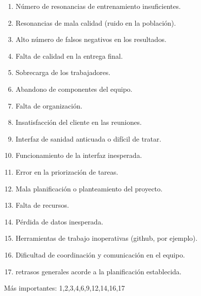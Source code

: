 \begin{enumerate}
	\item Número de resonancias de entrenamiento insuficientes.
	\item Resonancias de mala calidad (ruido en la población).
	\item Alto número de falsos negativos en los resultados.
	\item Falta de calidad en la entrega final.
	\item Sobrecarga de los trabajadores.
	\item Abandono de componentes del equipo.
	\item Falta de organización.
	\item Insatisfacción del cliente en las reuniones.
	\item Interfaz de sanidad anticuada o difícil de tratar.
	\item Funcionamiento de la interfaz inesperada.
	\item Error en la priorización de tareas.
	\item Mala planificación o planteamiento del proyecto.
	\item Falta de recursos.
	\item Pérdida de datos inesperada.
	\item Herramientas de trabajo inoperativas (github, por ejemplo).
	\item Dificultad de coordinación y comunicación en el equipo.
	\item retrasos generales acorde a la planificación establecida.
\end{enumerate}

Más importantes: 1,2,3,4,6,9,12,14,16,17


%
%

       
